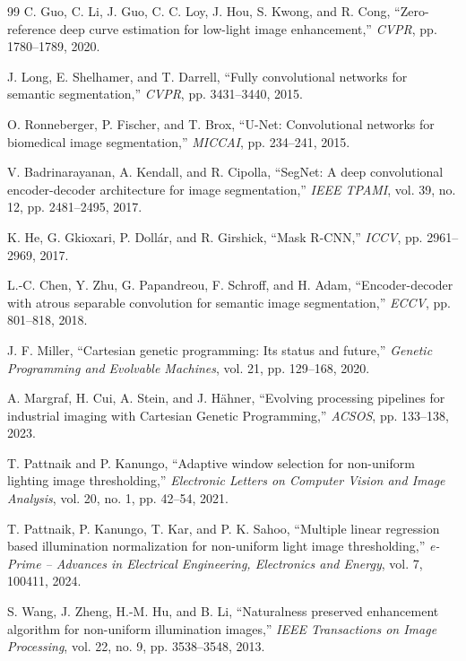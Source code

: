 \documentclass[11pt,a4paper]{article}
\begin{document}
\begin{thebibliography}{99}
C. Guo, C. Li, J. Guo, C. C. Loy, J. Hou, S. Kwong, and R. Cong,
``Zero-reference deep curve estimation for low-light image enhancement,''
\emph{CVPR}, pp. 1780--1789, 2020.

J. Long, E. Shelhamer, and T. Darrell,
``Fully convolutional networks for semantic segmentation,''
\emph{CVPR}, pp. 3431--3440, 2015.

O. Ronneberger, P. Fischer, and T. Brox,
``U-Net: Convolutional networks for biomedical image segmentation,''
\emph{MICCAI}, pp. 234--241, 2015.

V. Badrinarayanan, A. Kendall, and R. Cipolla,
``SegNet: A deep convolutional encoder-decoder architecture for image segmentation,''
\emph{IEEE TPAMI}, vol. 39, no. 12, pp. 2481--2495, 2017.

K. He, G. Gkioxari, P. Dollár, and R. Girshick,
``Mask R-CNN,''
\emph{ICCV}, pp. 2961--2969, 2017.

L.-C. Chen, Y. Zhu, G. Papandreou, F. Schroff, and H. Adam,
``Encoder-decoder with atrous separable convolution for semantic image segmentation,''
\emph{ECCV}, pp. 801--818, 2018.

J. F. Miller,
``Cartesian genetic programming: Its status and future,''
\emph{Genetic Programming and Evolvable Machines}, vol. 21, pp. 129--168, 2020.

A. Margraf, H. Cui, A. Stein, and J. Hähner,
``Evolving processing pipelines for industrial imaging with Cartesian Genetic Programming,''
\emph{ACSOS}, pp. 133--138, 2023.

T. Pattnaik and P. Kanungo, ``Adaptive window selection for non-uniform lighting image thresholding,'' \emph{Electronic Letters on Computer Vision and Image Analysis}, vol. 20, no. 1, pp. 42--54, 2021.

T. Pattnaik, P. Kanungo, T. Kar, and P. K. Sahoo, ``Multiple linear regression based illumination normalization for non-uniform light image thresholding,'' \emph{e-Prime -- Advances in Electrical Engineering, Electronics and Energy}, vol. 7, 100411, 2024.

S. Wang, J. Zheng, H.-M. Hu, and B. Li, ``Naturalness preserved enhancement algorithm for non-uniform illumination images,'' \emph{IEEE Transactions on Image Processing}, vol. 22, no. 9, pp. 3538--3548, 2013.


\end{thebibliography}
\end{document}
